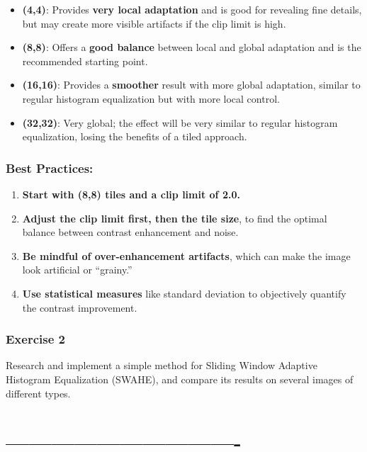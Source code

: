 \documentclass[11pt]{article}
\providecommand{\tightlist}{%
      \setlength{\itemsep}{0pt}\setlength{\parskip}{0pt}}
\begin{document}
\begin{itemize}
\tightlist
\item
  \textbf{(4,4)}: Provides \textbf{very local adaptation} and is good
  for revealing fine details, but may create more visible artifacts if
  the clip limit is high.
\item
  \textbf{(8,8)}: Offers a \textbf{good balance} between local and
  global adaptation and is the recommended starting point.
\item
  \textbf{(16,16)}: Provides a \textbf{smoother} result with more global
  adaptation, similar to regular histogram equalization but with more
  local control.
\item
  \textbf{(32,32)}: Very global; the effect will be very similar to
  regular histogram equalization, losing the benefits of a tiled
  approach.
\end{itemize}

\hypertarget{best-practices}{%
\subsubsection{Best Practices:}\label{best-practices}}

\begin{enumerate}
\def\labelenumi{\arabic{enumi}.}
\tightlist
\item
  \textbf{Start with (8,8) tiles and a clip limit of 2.0.}
\item
  \textbf{Adjust the clip limit first, then the tile size}, to find the
  optimal balance between contrast enhancement and noise.
\item
  \textbf{Be mindful of over-enhancement artifacts}, which can make the
  image look artificial or ``grainy.''
\item
  \textbf{Use statistical measures} like standard deviation to
  objectively quantify the contrast improvement.
\end{enumerate}

    \hypertarget{exercise-2}{%
\subsubsection{Exercise 2}\label{exercise-2}}

Research and implement a simple method for Sliding Window Adaptive
Histogram Equalization (SWAHE), and compare its results on several
images of different types.

\hypertarget{section}{%
\section{-------------------------------}\label{section}}
\end{document}
